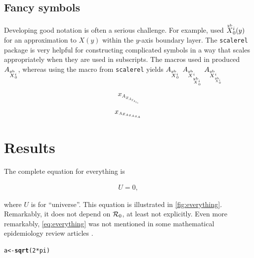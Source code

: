\documentclass[12pt]{article}\usepackage[]{graphicx}\usepackage[]{xcolor}
\makeatletter
\newcommand{\hlnum}[1]{\textcolor[rgb]{0.686,0.059,0.569}{#1}}%
\newcommand{\hlopt}[1]{\textcolor[rgb]{0,0,0}{#1}}%
\newcommand{\hlstd}[1]{\textcolor[rgb]{0.345,0.345,0.345}{#1}}%
\newcommand{\hlkwb}[1]{\textcolor[rgb]{0.69,0.353,0.396}{#1}}%
\newcommand{\hlkwd}[1]{\textcolor[rgb]{0.737,0.353,0.396}{\textbf{#1}}}%
\newenvironment{kframe}{%
 \def\at@end@of@kframe{}%
 \ifinner\ifhmode%
  \def\at@end@of@kframe{\end{minipage}}%
  \begin{minipage}{\columnwidth}%
 \fi\fi%
 \def\FrameCommand##1{\hskip\@totalleftmargin \hskip-\fboxsep
 \colorbox{shadecolor}{##1}\hskip-\fboxsep
     \hskip-\linewidth \hskip-\@totalleftmargin \hskip\columnwidth}%
 \MakeFramed {\advance\hsize-\width
   \@totalleftmargin\z@ \linewidth\hsize
   \@setminipage}}%
 {\par\unskip\endMakeFramed%
 \at@end@of@kframe}
\newenvironment{knitrout}{}{} %
\makeatother
\begin{document}
\subsection{Fancy symbols}


Developing good notation is often a serious challenge.
For example, \cite{ParsEarn24} used $\overset{\textrm{\tiny\upshape $y$b}}X{}_{0}^{i}(y)$ for
an approximation to $X(y)$ within the $y$-axis
boundary layer.  The \texttt{scalerel} package is very helpful
for constructing complicated symbols in a way that scales
appropriately
when they are used in subscripts.   The macros used
in \cite{ParsEarn24} produced $A_{\overset{\textrm{\tiny\upshape $y$b}}X{}_{0}^{i}}$, whereas
using the  macro from \texttt{scalerel} yields
$A_{\overset{\textrm{\tiny\upshape $y$b}}X{}_{0}^{i}}$ $A_{\overset{\textrm{\tiny\upshape $y$b}}X{}_{\overset{\textrm{\tiny\upshape $y$b}}X{}_{0}^{i}}^{i}}$
$A_{\Xybfancy{\scaleobj{0.8}{\Xybfancy{0}{i}}}{i}}$

\newcommand{\tmpout}{{x_{A}}}
\begin{equation}
\tmpout_{\tmpout_{\tmpout_{\tmpout}}}
\end{equation}
\renewcommand{\tmpout}{{x_{\scaleobj{0.8}{A}}}}
\begin{equation}
\tmpout_{\tmpout_{\tmpout_{\tmpout}}}
\end{equation}

\section{Results}\label{sec:results}

The complete equation for everything is
\begin{linenomath*}
\begin{align}\label{eq:everything}
  U = 0,
\end{align}
\end{linenomath*}
where $U$ is for ``universe''.  This equation is illustrated
in \cref{fig:everything}.  Remarkably, it does not depend on ${\mathcal R}_0$,
at least not explicitly.  Even more remarkably, \cref{eq:everything}
was not mentioned in some mathematical epidemiology review articles
\cite{Earn+02,Earn04,Earn08,Earn09}.

\begin{knitrout}
\color{fgcolor}\begin{kframe}
\begin{alltt}
\hlstd{a} \hlkwb{<-} \hlkwd{sqrt}\hlstd{(}\hlnum{2}\hlopt{*}\hlstd{pi)}
\end{alltt}
\end{kframe}
\end{knitrout}
\end{document}
